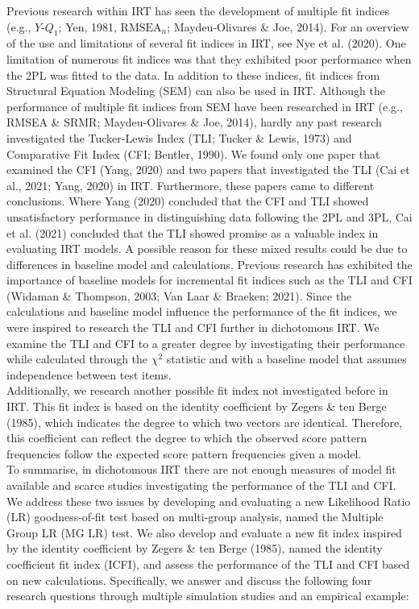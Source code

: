 \documentclass[Royal,sageapa,times,doublespace]{sagej}
\begin{document}
\indent Previous research within IRT has seen the development of multiple fit indices (e.g., $Y\text{-}Q_1$; Yen, 1981, $\text{RMSEA}_n$; Maydeu-Olivares \& Joe, 2014). For an overview of the use and limitations of several fit indices in IRT, see Nye et al. (2020). One limitation of numerous fit indices was that they exhibited poor performance when the 2PL was fitted to the data. In addition to these indices, fit indices from Structural Equation Modeling (SEM) can also be used in IRT. Although the performance of multiple fit indices from SEM have been researched in IRT (e.g., RMSEA \& SRMR; Maydeu-Olivares \& Joe, 2014), hardly any past research investigated the Tucker-Lewis Index (TLI; Tucker \& Lewis, 1973) and Comparative Fit Index (CFI; Bentler, 1990). We found only one paper that examined the CFI (Yang, 2020) and two papers that investigated the TLI (Cai et al., 2021; Yang, 2020) in IRT. Furthermore, these papers came to different conclusions. Where Yang (2020) concluded that the CFI and TLI showed unsatisfactory performance in distinguishing data following the 2PL and 3PL, Cai et al. (2021) concluded that the TLI showed promise as a valuable index in evaluating IRT models. A possible reason for these mixed results could be due to differences in baseline model and calculations. Previous research has exhibited the importance of baseline models for incremental fit indices such as the TLI and CFI (Widaman \& Thompson, 2003; Van Laar \& Braeken; 2021). Since the calculations and baseline model influence the performance of the fit indices, we were inspired to research the TLI and CFI further in dichotomous IRT. We examine the TLI and CFI to a greater degree by investigating their performance while calculated through the $\chi^2$ statistic and with a baseline model that assumes independence between test items. \\
\indent Additionally, we research another possible fit index not investigated before in IRT. This fit index is based on the identity coefficient by Zegers \& ten Berge (1985), which indicates the degree to which two vectors are identical. Therefore, this coefficient can reflect the degree to which the observed score pattern frequencies follow the expected score pattern frequencies given a model. \\
\indent To summarise, in dichotomous IRT there are not enough measures of model fit available and scarce studies investigating the performance of the TLI and CFI. We address these two issues by developing and evaluating a new Likelihood Ratio (LR) goodness-of-fit test based on multi-group analysis, named the Multiple Group LR (MG LR) test. We also develop and evaluate a new fit index inspired by the identity coefficient by Zegers \& ten Berge (1985), named the identity coefficient fit index (ICFI), and assess the performance of the TLI and CFI based on new calculations. Specifically, we answer and discuss the following four research questions through multiple simulation studies and an empirical example:
\end{document}
